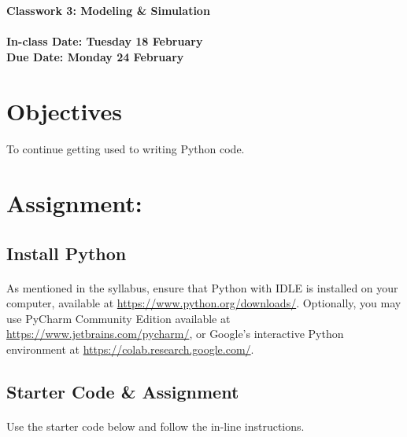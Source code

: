 \documentclass[letter,10pt]{article}
\begin{document}
    \huge
    \textbf{Classwork 3: Modeling \& Simulation}
    \normalsize
    \\ ~~ \\
    \textbf{In-class Date: Tuesday 18 February} \\
    \textbf{Due Date: Monday 24 February}
    
    \section*{Objectives}
    \paragraph{}To continue getting used to writing Python code.
    
    \section*{Assignment:}
    \subsection{Install Python}
    \paragraph{}As mentioned in the syllabus, ensure that Python with IDLE is installed on your computer, available at \url{https://www.python.org/downloads/}. Optionally, you may use PyCharm Community Edition available at \url{https://www.jetbrains.com/pycharm/}, or Google's interactive Python environment at \url{https://colab.research.google.com/}.
    
    \subsection*{Starter Code \& Assignment}
    \paragraph{}Use the starter code below and follow the in-line instructions.
    
\end{document}

